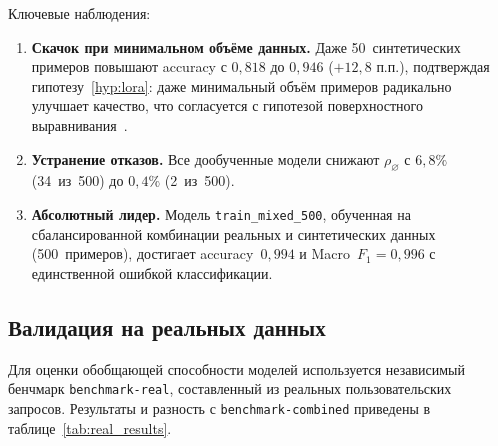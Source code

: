Ключевые наблюдения:
\begin{enumerate}
    \item \textbf{Скачок при минимальном объёме данных.} Даже 50~синтетических примеров повышают accuracy с $0{,}818$ до $0{,}946$ ($+12{,}8$ п.п.), подтверждая гипотезу~\ref{hyp:lora}: даже минимальный объём примеров радикально улучшает качество, что согласуется с гипотезой поверхностного выравнивания~\cite{zhou2023lima}.

    \item \textbf{Устранение отказов.} Все дообученные модели снижают $\rho_\varnothing$ с $6{,}8\%$ (34~из~500) до $0{,}4\%$ (2~из~500).

    \item \textbf{Абсолютный лидер.} Модель \texttt{train\_mixed\_500}, обученная на сбалансированной комбинации реальных и синтетических данных (500~примеров), достигает accuracy~$0{,}994$ и Macro~$F_1 = 0{,}996$ с единственной ошибкой классификации.
\end{enumerate}

\subsection{Валидация на реальных данных} \label{subsec:real_validation}

Для оценки обобщающей способности моделей используется независимый бенчмарк \texttt{benchmark-real}, составленный из реальных пользовательских запросов. Результаты и разность с \texttt{benchmark-combined} приведены в таблице~\ref{tab:real_results}.

